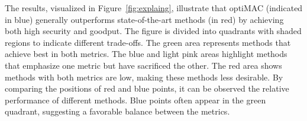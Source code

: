 The results, visualized in Figure~\ref{fig:explaing}, illustrate that optiMAC (indicated in blue) generally outperforms state-of-the-art methods (in red) by achieving both high security and goodput.  The figure is divided into quadrants with shaded regions to indicate different trade-offs. The green area represents methods that achieve best in both metrics. The blue and light pink areas highlight methods that emphasize one metric but have sacrificed the other. The red area shows methods with both metrics are low, making these methods less desirable. By comparing the positions of red and blue points, it can be observed the relative performance of different methods. Blue points often appear in the green quadrant, suggesting a favorable balance between the metrics. 
%

